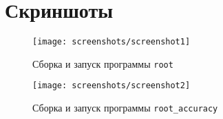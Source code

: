 \newpage
\section{Скриншоты}

\begin{figure}[H]
  \centering
  \texttt{[image: screenshots/screenshot1]}
  \caption{Сборка и запуск программы \texttt{root}}
\end{figure}

\begin{figure}[H]
  \centering
  \texttt{[image: screenshots/screenshot2]}
  \caption{Сборка и запуск программы \texttt{root\_accuracy}}
\end{figure}
